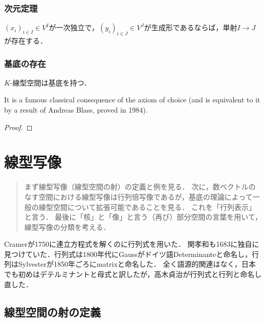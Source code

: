 \documentclass[uplatex, dvipdfmx]{jsreport}
\begin{document}
\subsection{次元定理}

\begin{theorem}
    $(x_i)_{i\in I}\in V^I$が一次独立で，$(y_i)_{i\in J}\in V^J$が生成形であるならば，単射$I\to J$が存在する．
\end{theorem}

\subsection{基底の存在}

\begin{theorem}\label{thm-basis}
    $K$-線型空間は基底を持つ．
\end{theorem}
\begin{remark}[選択公理と同値]
    It is a famous classical consequence of the axiom of choice (and is equivalent to it by a result of Andreas Blass, proved in 1984).
\end{remark}
\begin{proof}
    
\end{proof}

\chapter{線型写像}

\begin{quotation}
    まず線型写像（線型空間の射）の定義と例を見る．
    次に，数ベクトルのなす空間における線型写像は行列倍写像であるが，基底の理論によって一般の線型空間について拡張可能であることを見る．
    これを「行列表示」と言う．
    最後に「核」と「像」と言う（再び）部分空間の言葉を用いて，線型写像の分類を考える．
\end{quotation}

\begin{history}
    Cramerが1750に連立方程式を解くのに行列式を用いた．
    関孝和も1683に独自に見つけていた．行列式は1800年代にGaussがドイツ語Determinanteと命名し，行列はSylvesterが1850年ごろにmatrixと命名した．
    全く語源的関連はなく，日本でも初めはデテルミナントと母式と訳したが，高木貞治が行列式と行列と命名し直した．
\end{history}

\section{線型空間の射の定義}
\end{document}
